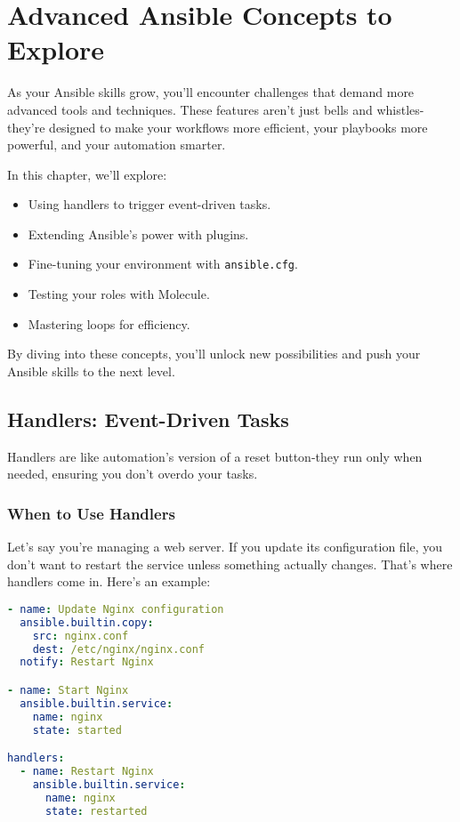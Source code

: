 \chapter{Advanced Ansible Concepts to Explore}

As your Ansible skills grow, you'll encounter challenges that demand more advanced tools and techniques. These features aren't just bells and whistles-they're designed to make your workflows more efficient, your playbooks more powerful, and your automation smarter.  

In this chapter, we'll explore:
\begin{itemize}
    \item Using handlers to trigger event-driven tasks.
    \item Extending Ansible's power with plugins.
    \item Fine-tuning your environment with \texttt{ansible.cfg}.
    \item Testing your roles with Molecule.
    \item Mastering loops for efficiency.
\end{itemize}

By diving into these concepts, you'll unlock new possibilities and push your Ansible skills to the next level.


\section{Handlers: Event-Driven Tasks}

Handlers are like automation's version of a reset button-they run only when needed, ensuring you don't overdo your tasks.

\subsection{When to Use Handlers}

Let's say you're managing a web server. If you update its configuration file, you don't want to restart the service unless something actually changes. That's where handlers come in. Here's an example:
\begin{lstlisting}[language=yaml, caption=Using Handlers for Service Restarts]
- name: Update Nginx configuration
  ansible.builtin.copy:
    src: nginx.conf
    dest: /etc/nginx/nginx.conf
  notify: Restart Nginx

- name: Start Nginx
  ansible.builtin.service:
    name: nginx
    state: started

handlers:
  - name: Restart Nginx
    ansible.builtin.service:
      name: nginx
      state: restarted
\end{lstlisting}

